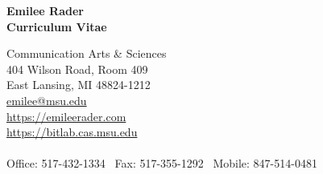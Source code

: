 \documentclass[9pt]{extarticle}
\begin{document}
{\LARGE{\textbf{Emilee Rader}}}  \\ \vspace{3pt}
\textbf{Curriculum Vitae}


\begin{tabbing}
Communication Arts \& Sciences \hspace{1.5in}\=  \\
404 Wilson Road, Room 409 \\
East Lansing, MI 48824-1212 \\
\href{mailto:emilee@msu.edu}{emilee@msu.edu} \\
\href{https://emileerader.com/}{https://emileerader.com}  \\
\href{https://bitlab.cas.msu.edu/}{https://bitlab.cas.msu.edu}  \\\\
Office: 517-432-1334  \textpipe  ~Fax: 517-355-1292  \textpipe  ~Mobile: 847-514-0481 \\\\\\
\end{tabbing}



\end{document}
